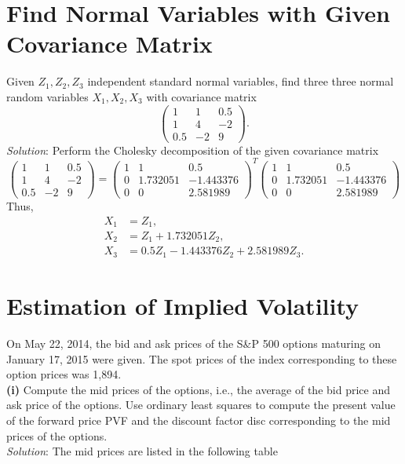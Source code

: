 \documentclass[paper=a4, fontsize=11pt]{scrartcl} %
\numberwithin{equation}{section} %
\numberwithin{figure}{section} %
\numberwithin{table}{section} %
\begin{document}
\newpage


\section{Find Normal Variables with Given Covariance Matrix}
Given $Z_1,Z_2,Z_3$ independent standard normal variables, find three three normal random variables $X_1,X_2,X_3$ with covariance matrix
$$
\begin{pmatrix}
1&1&0.5\\
1&4&-2\\
0.5&-2&9
\end{pmatrix}.
$$
\textit{Solution}: Perform the Cholesky decomposition of the given covariance matrix
$$
\begin{pmatrix}
1&1&0.5\\
1&4&-2\\
0.5&-2&9
\end{pmatrix} = \begin{pmatrix}
1&1&0.5\\
0&1.732051&-1.443376\\
0&0&2.581989
\end{pmatrix}^T
\begin{pmatrix}
1&1&0.5\\
0&1.732051&-1.443376\\
0&0&2.581989
\end{pmatrix}
$$
Thus,
\begin{align}
\nonumber X_1 &= Z_1, \\
\nonumber X_2 &= Z_1 + 1.732051 Z_2,  \\
\nonumber X_3 &= 0.5Z_1 -1.443376 Z_2 + 2.581989 Z_3.
\end{align}
\newpage

\section{Estimation of Implied Volatility}
On May 22, 2014, the bid and ask prices of the S\&P 500 options maturing on January 17, 2015 were given. The spot prices of the index corresponding to these option prices was 1,894.\\

\textbf{(i)} Compute the mid prices of the options, i.e., the average of the bid price and ask price of the options.
Use ordinary least squares to compute the present value of the forward price PVF and the discount factor disc corresponding
to the mid prices of the options.\\
\textit{Solution}: The mid prices are listed in the following table\\
{\footnotesize
{}
}
\end{document}
